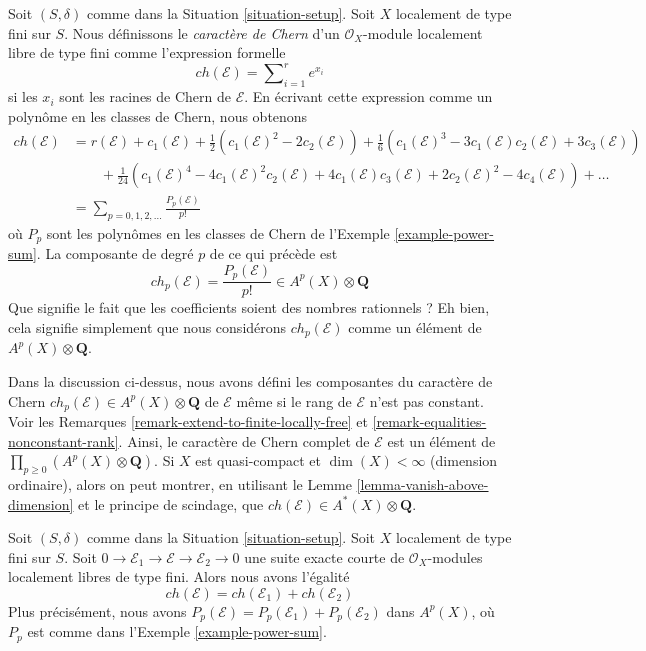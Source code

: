 \noindent
Soit $(S, \delta)$ comme dans la Situation \ref{situation-setup}.
Soit $X$ localement de type fini sur $S$.
Nous définissons le {\it caractère de Chern} d'un
$\mathcal{O}_X$-module localement libre de type fini comme l'expression formelle
$$
ch({\mathcal E}) = \sum\nolimits_{i=1}^r e^{x_i}
$$
si les $x_i$ sont les racines de Chern de ${\mathcal E}$. En écrivant cette
expression comme un polynôme en les classes de Chern, nous obtenons
\begin{align*}
ch(\mathcal{E})
& =
r(\mathcal{E})
+
c_1(\mathcal{E}) +
\frac{1}{2}(c_1(\mathcal{E})^2 - 2c_2(\mathcal{E}))
+
\frac{1}{6}(c_1(\mathcal{E})^3 - 3c_1(\mathcal{E})c_2(\mathcal{E}) + 3c_3(\mathcal{E})) \\
& \quad\quad +
\frac{1}{24}(c_1(\mathcal{E})^4 - 4c_1(\mathcal{E})^2c_2(\mathcal{E}) + 4c_1(\mathcal{E})c_3(\mathcal{E}) + 2c_2(\mathcal{E})^2 - 4c_4(\mathcal{E}))
+
\ldots \\
& =
\sum\nolimits_{p = 0, 1, 2, \ldots} \frac{P_p(\mathcal{E})}{p!}
\end{align*}
où $P_p$ sont les polynômes en les classes de Chern de
l'Exemple \ref{example-power-sum}. La composante de degré $p$ de
ce qui précède est
$$
ch_p(\mathcal{E}) = \frac{P_p(\mathcal{E})}{p!} \in A^p(X) \otimes \mathbf{Q}
$$
Que signifie le fait que les coefficients soient des nombres rationnels ?
Eh bien, cela signifie simplement que nous considérons
$ch_p(\mathcal{E})$ comme un élément de $A^p(X) \otimes \mathbf{Q}$.

\begin{remark}
\label{remark-extend-chern-character-to-finite-locally-free}
Dans la discussion ci-dessus, nous avons défini les composantes du caractère de Chern
$ch_p(\mathcal{E}) \in A^p(X) \otimes \mathbf{Q}$
de $\mathcal{E}$ même si le rang de $\mathcal{E}$
n'est pas constant. Voir les Remarques \ref{remark-extend-to-finite-locally-free} et
\ref{remark-equalities-nonconstant-rank}. Ainsi, le caractère de Chern complet
de $\mathcal{E}$ est
un élément de $\prod_{p \geq 0} (A^p(X) \otimes \mathbf{Q})$. Si $X$
est quasi-compact et $\dim(X) < \infty$ (dimension ordinaire), alors on peut montrer,
en utilisant le Lemme \ref{lemma-vanish-above-dimension} et le principe de scindage,
que $ch(\mathcal{E}) \in A^*(X) \otimes \mathbf{Q}$.
\end{remark}

\begin{lemma}
\label{lemma-chern-character-additive}
Soit $(S, \delta)$ comme dans la Situation \ref{situation-setup}. Soit $X$ localement
de type fini sur $S$. Soit
$
0 \to \mathcal{E}_1 \to \mathcal{E} \to \mathcal{E}_2 \to 0
$
une suite exacte courte de $\mathcal{O}_X$-modules localement libres de type fini.
Alors nous avons l'égalité
$$
ch(\mathcal{E}) = ch(\mathcal{E}_1) + ch(\mathcal{E}_2)
$$
Plus précisément, nous avons
$P_p(\mathcal{E}) = P_p(\mathcal{E}_1) + P_p(\mathcal{E}_2)$
dans $A^p(X)$, où $P_p$ est comme dans l'Exemple \ref{example-power-sum}.
\end{lemma}

